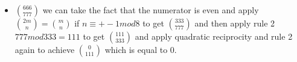 \documentclass[12pt]{article}
\begin{document}
\begin{enumerate}
\begin{itemize}
      \item $\binom{666}{777} $ we can take the fact that the numerator is even and apply $\binom{2m}{n} = \binom{m}{n} $ if $ n \equiv +-1  mod  8 $ to get $\binom{333}{777}$ and then apply rule 2 $777   mod   333= 111 $ 
        to get $ \binom{111}{333} $ and apply quadratic reciprocity and rule 2 again to achieve $\binom{0}{111}$ which is equal to 0.
    \end{itemize}
   
\end{enumerate}
\end{document}
